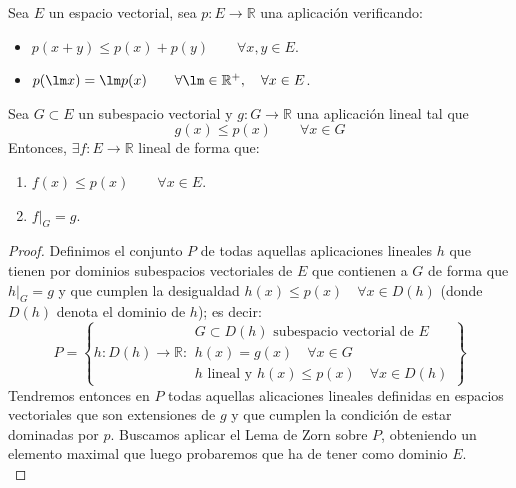 \begin{teo}
    Sea $E$ un espacio vectorial, sea $p:E\to \mathbb{R}$ una aplicación verificando:
    \begin{itemize}
        \item $p(x+y) \leq p(x) + p(y) \qquad \forall x,y\in E$.
        \item $p(\lm x) = \lm p(x) \qquad \forall \lm \in \mathbb{R}^+ , \quad \forall x\in E$.
    \end{itemize}
    Sea $G\subset E$ un subespacio vectorial y $g:G\to \mathbb{R}$ una aplicación lineal tal que
    \begin{equation*}
        g(x) \leq p(x) \qquad \forall x\in G
    \end{equation*}
    Entonces, $\exists f:E\to \mathbb{R}$ lineal de forma que: 
    \begin{enumerate}
        \item $f(x) \leq p(x) \qquad \forall x\in E$.
        \item $f\big|_G = g$.
    \end{enumerate}
    \begin{proof}
        Definimos el conjunto $P$ de todas aquellas aplicaciones lineales $h$ que tienen por dominios subespacios vectoriales de $E$ que contienen a $G$ de forma que $h\big|_G = g$ y que cumplen la desigualdad $h(x) \leq p(x) \quad \forall x\in D(h)$ (donde $D(h)$ denota el dominio de $h$); es decir:
        \begin{equation*}
            P = \left\{h:D(h) \to \mathbb{R} : \left.\begin{array}{l}
                G\subset D(h) \text{\ subespacio vectorial de\ } E \\
                h(x) = g(x) \quad \forall x\in G\\
                h \text{\ lineal y\ } h(x) \leq p(x) \quad \forall x\in D(h) 
            \end{array}\right.\right\}
        \end{equation*}
        Tendremos entonces en $P$ todas aquellas alicaciones lineales definidas en espacios vectoriales que son extensiones de $g$ y que cumplen la condición de estar dominadas por $p$. Buscamos aplicar el Lema de Zorn sobre $P$, obteniendo un elemento maximal que luego probaremos que ha de tener como dominio $E$.\\


\end{proof}
\end{teo}
